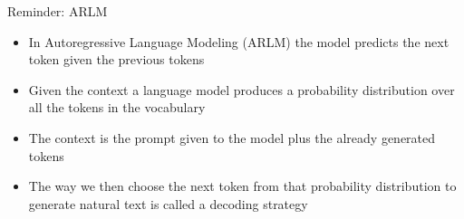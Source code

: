 \begin{frame}{Reminder: ARLM}

\vfill

\begin{itemize}
    \item In Autoregressive Language Modeling (ARLM) the model predicts the next token given the previous tokens
    \item Given the context a language model produces a probability distribution over all the tokens in the vocabulary
    \item The context is the prompt given to the model plus the already generated tokens
    \item The way we then choose the next token from that probability distribution to generate natural text is called a decoding strategy
\end{itemize}

\vfill
    
\end{frame}


